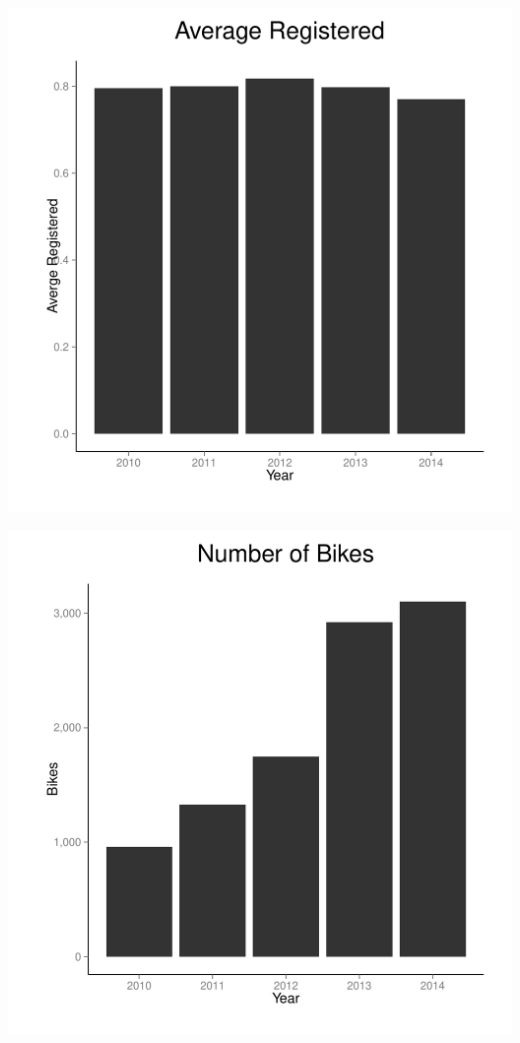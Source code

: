 \documentclass[12pt]{article}
\begin{document}
\begin{minipage}{.5\textwidth}
\includegraphics[scale=0.5]{../graphs/avg_reg.pdf}
\end{minipage}%
\begin{minipage}{.5\textwidth}
\includegraphics[scale=0.5]{../graphs/num_bikes.pdf}
\end{minipage}
\end{document}
